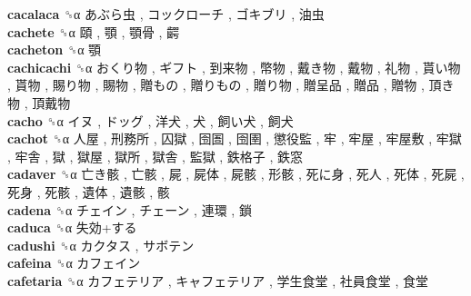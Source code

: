 \textbf{cacalaca} ␝α   あぶら虫 ,  コックローチ ,  ゴキブリ ,  油虫   \\
\textbf{cachete} ␝α   頤 ,  顎 ,  顎骨 ,  齶   \\
\textbf{cacheton} ␝α   顎   \\
\textbf{cachicachi} ␝α   おくり物 ,  ギフト ,  到来物 ,  幣物 ,  戴き物 ,  戴物 ,  礼物 ,  貰い物 ,  貰物 ,  賜り物 ,  賜物 ,  贈もの ,  贈りもの ,  贈り物 ,  贈呈品 ,  贈品 ,  贈物 ,  頂き物 ,  頂戴物   \\
\textbf{cacho} ␝α   イヌ ,  ドッグ ,  洋犬 ,  犬 ,  飼い犬 ,  飼犬   \\
\textbf{cachot} ␝α   人屋 ,  刑務所 ,  囚獄 ,  囹圄 ,  囹圉 ,  懲役監 ,  牢 ,  牢屋 ,  牢屋敷 ,  牢獄 ,  牢舎 ,  獄 ,  獄屋 ,  獄所 ,  獄舎 ,  監獄 ,  鉄格子 ,  鉄窓   \\
\textbf{cadaver} ␝α   亡き骸 ,  亡骸 ,  屍 ,  屍体 ,  屍骸 ,  形骸 ,  死に身 ,  死人 ,  死体 ,  死屍 ,  死身 ,  死骸 ,  遺体 ,  遺骸 ,  骸   \\
\textbf{cadena} ␝α   チェイン ,  チェーン ,  連環 ,  鎖   \\
\textbf{caduca} ␝α   失効+する   \\
\textbf{cadushi} ␝α   カクタス ,  サボテン   \\
\textbf{cafeina} ␝α   カフェイン   \\
\textbf{cafetaria} ␝α   カフェテリア ,  キャフェテリア ,  学生食堂 ,  社員食堂 ,  食堂   \\
